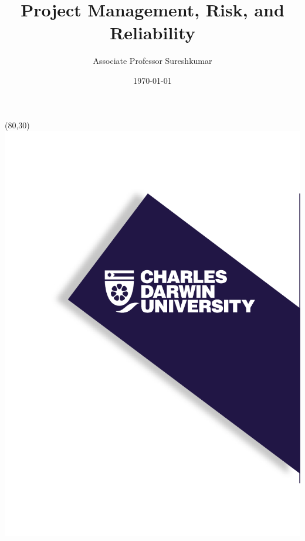\documentclass{beamer}
\title[PRT551 - Lecture 1]{Project Management, Risk, and Reliability} %
\author{Associate Professor Sureshkumar} %
\institute[CDU] %
{
Charles Darwin University \\ %
\medskip
\textit{cdux@cdu.edu.au} %
}
\date{\today} %
\begin{document}
\begin{frame}
\titlepage %
\begin{textblock}{20}(80,30)
      \includegraphics[scale=0.8]{logo_1.png}
\end{textblock}
\end{frame}

\end{document}
